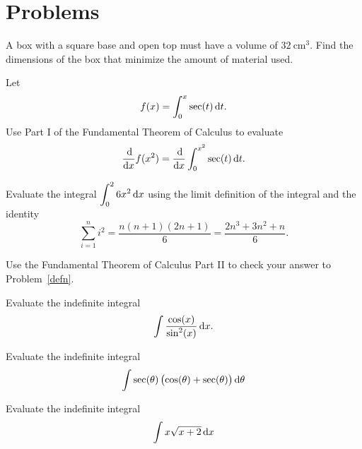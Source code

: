 \documentclass[12pt]{amsart}
\begin{document}
\section*{Problems}
\begin{thm}[10 Points]
  A box with a square base and open top must have a volume of \(32\ \text{cm}^3\).
  Find the dimensions of the box that minimize the amount of material used.\\
\end{thm}

\vspace{3in}

\begin{thm}[10 Points]
  Let
  \[f(x) = \int_0^x \sec(t)\dif t.\]
  Use Part I of the Fundamental Theorem of Calculus to evaluate
  \[\frac{\dif}{\dif x} f(x^2) = \frac{\dif}{\dif x} \int_0^{x^2} \sec(t)\dif t.\]

\end{thm}

\newpage

\begin{thm}[10 Points]\label{defn}
  Evaluate the integral \(\displaystyle{\int_0^2 6x^2 \dif x}\) using the limit definition of the integral and the identity
  \[\sum_{i = 1}^n i^2 = \frac{n(n+1)(2n + 1)}{6} = \frac{2n^3 + 3n^2 + n}{6}.\]
\end{thm}

\vspace{5in}

\begin{thm}[10 Points]
  Use the Fundamental Theorem of Calculus Part II to check your answer to Problem~\ref{defn}.
\end{thm}

\newpage

\begin{thm}[10 Points]
  Evaluate the indefinite integral
  \[\int\frac{\cos(x)}{\sin^2(x)}\dif x.\]
\end{thm}

\vspace{3in}

\begin{thm}[10 Points]
  Evaluate the indefinite integral
  \[\int \sec(\theta)\left(\cos(\theta) + \sec(\theta)\right)\dif \theta\]
\end{thm}

\newpage

\begin{thm}[10 Points]
  Evaluate the indefinite integral
  \[\int x\sqrt{x + 2}\dif x\]
\end{thm}
\end{document}
